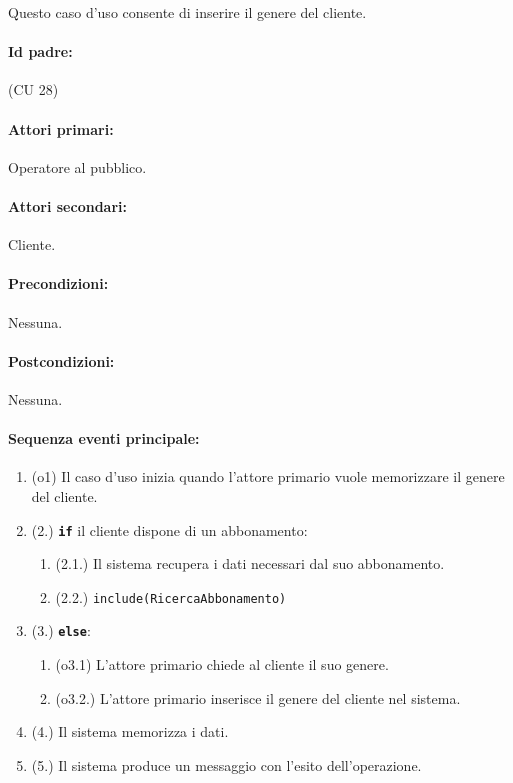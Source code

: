 \documentclass{article}
\begin{document}
	\indent\indent Questo caso d'uso consente di inserire il genere del cliente.
	
	\paragraph{Id padre:} (CU 28)
	
	\paragraph{Attori primari:}Operatore al pubblico.
	
	\paragraph{Attori secondari:}Cliente.
	
	\paragraph{Precondizioni:}Nessuna.
	
	\paragraph{Postcondizioni:}Nessuna.
	
	\paragraph{Sequenza eventi principale:}

	\begin{enumerate}[itemsep=8pt,parsep=0pt]
	    \item(o1) Il caso d'uso inizia quando l'attore primario vuole memorizzare il genere del cliente. 
	    \item(2.) \texttt{\textbf{if}} il cliente dispone di un abbonamento:
			\begin{enumerate}	[leftmargin=28pt]
			\item (2.1.) Il sistema recupera i dati necessari dal suo abbonamento. %
			\item (2.2.) \texttt{{include(RicercaAbbonamento)}}
  			\end{enumerate}
  		\item(3.) \texttt{\textbf{else}}:
  		\begin{enumerate}	[leftmargin=28pt]
	        \item(o3.1) L'attore primario chiede al cliente il suo genere. %
	        \item(o3.2.) L'attore primario inserisce il genere del cliente nel sistema.
	    \end{enumerate}
		\item(4.) Il sistema memorizza i dati.
		\item(5.) Il sistema produce un messaggio con l'esito dell'operazione.
	\end{enumerate}
	
\end{document}
